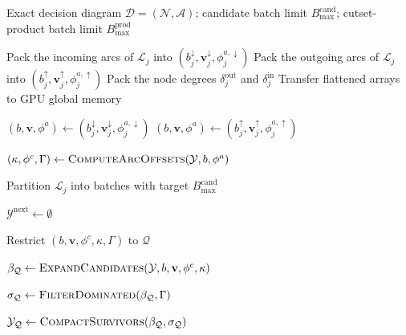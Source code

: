 \documentclass[letterpaper]{article}
\begin{document}
\begin{algorithm}[t!]
\caption{GPU-based Bidirectional PF Enumeration}
\label{alg:gpu_bidir_pf}
\begin{algorithmic}[1]
\Require Exact decision diagram
$\mathcal{D}=(\mathcal{N},\mathcal{A})$;
candidate batch limit $B_{\max}^{\mathrm{cand}}$;
cutset-product batch limit $B_{\max}^{\mathrm{prod}}$

        \State Pack the incoming arcs of $\mathcal{L}_j$ into
        $(b_j^{\downarrow},
          \mathbf{v}_j^{\downarrow},
          \phi_j^{a,\downarrow})$
        \State Pack the outgoing arcs of $\mathcal{L}_j$ into
        $(b_j^{\uparrow},
          \mathbf{v}_j^{\uparrow},
          \phi_j^{a,\uparrow})$
        \State Pack the node degrees
        $\delta_j^{\mathrm{out}}$ and
        $\delta_j^{\mathrm{in}}$
    \EndFor
    \State Transfer flattened arrays to GPU global memory
\EndProcedure

        \State
        $(b,\mathbf{v},\phi^a)
        \gets
        (b_j^{\downarrow},
         \mathbf{v}_j^{\downarrow},
         \phi_j^{a,\downarrow})$
    \Else
        \State
        $(b,\mathbf{v},\phi^a)
        \gets
        (b_j^{\uparrow},
         \mathbf{v}_j^{\uparrow},
         \phi_j^{a,\uparrow})$
    \EndIf

    \State
    $(\kappa,\phi^c,\Gamma)
    \gets
    \Call{ComputeArcOffsets}
    {\mathcal{Y},b,\phi^a}$

    \State
    Partition $\mathcal{L}_j$ into batches with target
    $B_{\max}^{\mathrm{cand}}$

    \State
    $\mathcal{Y}^{\mathrm{next}}\gets\emptyset$

        \State Restrict
        $(b,\mathbf{v},\phi^c,\kappa,\Gamma)$
        to $\mathcal{Q}$

        \State
        $\beta_{\mathcal{Q}}
        \gets
        \Call{ExpandCandidates}
        {\mathcal{Y},b,\mathbf{v},\phi^c,\kappa}$

        \State
        $\sigma_{\mathcal{Q}}
        \gets
        \Call{FilterDominated}
        {\beta_{\mathcal{Q}},\Gamma}$

        \State
        $\mathcal{Y}_{\mathcal{Q}}
        \gets
        \Call{CompactSurvivors}
        {\beta_{\mathcal{Q}},\sigma_{\mathcal{Q}}}$


\end{algorithmic}
\end{algorithm}
\end{document}
